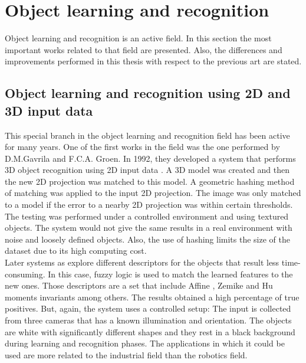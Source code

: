 \newpage
\section{Object learning and recognition}

Object learning and recognition is an active field. 
In this section the most important works related to that field are presented. 
Also, the differences and improvements performed in this thesis with respect to the previous art are stated. 

\subsection{Object learning and recognition using 2D and 3D input data}

This special branch in the object learning and recognition field has been active for many years. 
One of the first works in the field was the one performed by D.M.Gavrila and F.C.A. Groen. 
In 1992,  they developed a  system that performs 3D object recognition using 2D input data \cite{D.M.Gavrila1991}.
A 3D model was created and then the new 2D projection was matched to this model.
A geometric hashing method of matching was applied to the input 2D projection. 
The image was only matched to a model if the error to a nearby 2D projection was within certain thresholds.
The testing was performed under a controlled environment and using textured objects. 
The system would not give the same results in a real environment with noise and loosely defined objects. 
Also, the use of hashing limits the size of the dataset due to its high computing cost. 
\\

Later systems as \cite{Sheta2012} explore different descriptors for the objects that result less time-consuming. 
In this case, fuzzy logic is used to match the learned features to the new ones. 
Those descriptors are a set that include Affine \cite{Reiss:1991:RFT:117668.117680}, Zemike \cite{Teague} and Hu \cite{Hu1962} moments invariants among others. 
The results obtained a high percentage of true positives. 
But, again, the system uses a controlled setup:
The input is collected from three cameras that has a known illumination and orientation. 
The objects are white with significantly different shapes and they rest in a black background during learning and recognition phases. 
The applications in which it could be used are more related to the industrial field than the robotics field. 
\\

